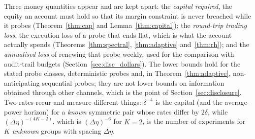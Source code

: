 \documentclass[12pt]{article}
\theoremstyle{definition}
\theoremstyle{remark}
\begin{document}
Three money quantities appear and are kept apart: the \emph{capital required}, the equity an account must hold so that its margin constraint is never breached while it probes (Theorem~\ref{thm:cap} and Lemma~\ref{thm:capital}); the \emph{round-trip trading loss}, the execution loss of a probe that ends flat, which is what the account actually spends (Theorems~\ref{thm:spectral}, \ref{thm:adaptive} and~\ref{thm:rh}); and the \emph{annualised loss} of renewing that probe weekly, used for the comparison with audit-trail budgets (Section~\ref{sec:disc_dollars}). The lower bounds hold for the stated probe classes, deterministic probes and, in Theorem~\ref{thm:adaptive}, non-anticipating sequential probes; they are not lower bounds on information obtained through other channels, which is the point of Section~\ref{sec:disclosure}. Two rates recur and measure different things: $\delta^{-4}$ is the capital (and the average-power horizon) for a \emph{known} symmetric pair whose rates differ by $2\delta$, while $(\Delta\eta)^{-(4K-2)}$, which is $(\Delta\eta)^{-6}$ for $K=2$, is the number of experiments for $K$ \emph{unknown} groups with spacing $\Delta\eta$.
\end{document}
